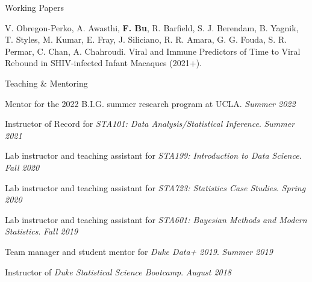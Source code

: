 \documentclass{resume} %
\begin{document}

\begin{rSection}{Working Papers}









V. Obregon-Perko, A. Awasthi, \textbf{F. Bu}, R. Barfield, S. J. Berendam, B. Yagnik,  T. Styles, M. Kumar, E. Fray, J. Siliciano, R. R. Amara, G. G. Fouda, S. R. Permar, C. Chan, A. Chahroudi. 
Viral and Immune Predictors of Time to Viral Rebound in SHIV-infected Infant Macaques (2021+).
\end{rSection}


\begin{rSection}{Teaching \& Mentoring}

Mentor for the 2022 B.I.G. summer research program at UCLA.  \hfill {\em Summer 2022}

Instructor of Record for \emph{STA101: Data Analysis/Statistical Inference}. \hfill {\em Summer 2021}

Lab instructor and teaching assistant for \emph{STA199: Introduction to Data Science}. \hfill {\em Fall 2020}


Lab instructor and teaching assistant for \emph{STA723: Statistics Case Studies}. \hfill {\em Spring 2020}


Lab instructor and teaching assistant for \emph{STA601: Bayesian Methods and Modern Statistics}. \hfill {\em Fall 2019}


Team manager and student mentor for \emph{Duke Data+ 2019}. \hfill {\em Summer 2019}

Instructor of \emph{Duke Statistical Science Bootcamp}. \hfill {\em August 2018}
\end{rSection}
\end{document}
